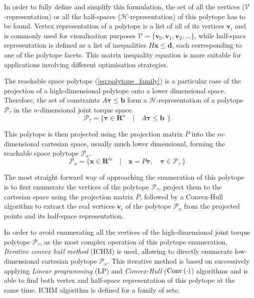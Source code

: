 In order to fully define and simplify this formulation, the set of all the vertices ($\mathcal{V}$-representation) or all the half-spaces ($\mathcal{H}$-representation) of this polytope has to be found. Vertex representation of a polytope is a list of all of its vertices $\bm{v}_i$ and is commonly used for visualisation purposes
$
\mathcal{V}\!= \!\{ \bm{v}_0, \bm{v}_1, \bm{v}_2, \dots \}
$,
while half-space representation is defined as a list of inequalities $H\bm{x} \leq \bm{d}$, each corresponding to one of the polytope facets. This matrix inequality equation is more suitable for applications involving different optimisation strategies.

The reachable space polytope (\ref{eq:polytope_family}) is a particular case of the projection of a high-dimensional polytope onto a lower dimensional space. Therefore, the set of constraints $A\bm{\tau}\leq\bm{b}$ form a $\mathcal{H}$-representation of a polytope $\mathcal{P}_\tau$ in the $n$-dimensional joint torque space.
\begin{equation}
    \mathcal{P}_\tau = \{ \bm{\tau} \in \mathbf{R}^n \quad| \quad A\bm{\tau}\leq \bm{b} ~~\}
\label{eq:polytope_torque}
\end{equation}

This polytope is then projected using the projection matrix $P$ into the $m$-dimensional cartesian space, usually much lower dimensional, forming the reachable space polytope $\mathcal{P}_x$.
\begin{equation}
    \mathcal{P}_x = \{ \bm{x} \in \mathbf{R}^m \quad| \quad \bm{x}=P\bm{\tau}, \quad \bm{\tau} \in \mathcal{P}_\tau ~\}
\label{eq:polytope_projection}
\end{equation}

The most straight forward way of approaching the enumeration of this polytope is to first enumerate the vertices of the polytope $\mathcal{P}_\tau$, project them to the cartesian space using the projection matrix $P$, followed by a Convex-Hull algorithm to extract the real vertices $\bm{v}_i$ of the polytope $\mathcal{P}_x$ from the projected points and its half-space representation.

In order to avoid enumerating all the vertices of the high-dimensional joint torque polytope $\mathcal{P}_\tau$, as the most complex operation of this polytope enumeration, \textit{Iterative convex hull method}\cite{skuric2022} (ICHM) is used, allowing to directly enumerate low-dimensional cartesian polytope $\mathcal{P}_x$. This iterative method is based on successively applying \textit{Linear programming} (LP) and \textit{Convex-Hull} ($\text{Conv}\left(\cdot\right)$) algorithms and is able to find both vertex and half-space representation of this polytope at the same time. ICHM algorithm is defined for a family of sets:

